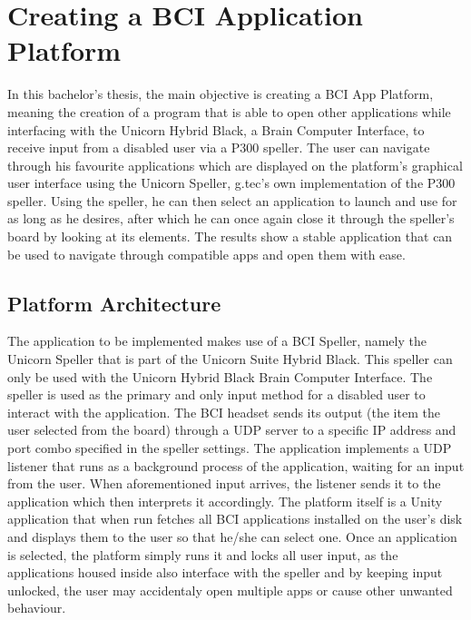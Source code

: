 
\chapter{Creating a BCI Application Platform}\label{cap:development}
In this bachelor's thesis, the main objective is creating a BCI App Platform, meaning the creation of a program that is able to open other applications while interfacing with the Unicorn Hybrid Black, a Brain Computer Interface, to receive input from a disabled user via a P300 speller. The user can navigate through his favourite applications which are displayed on the platform's graphical user interface using the Unicorn Speller, g.tec's own implementation of the P300 speller. Using the speller, he can then select an application to launch and use for as long as he desires, after which he can once again close it through the speller's board by looking at its elements. The results show a stable application that can be used to navigate through compatible apps and open them with ease.

\section{Platform Architecture}
The application to be implemented makes use of a BCI Speller, namely the Unicorn Speller that is part of the Unicorn Suite Hybrid Black. This speller can only be used with the Unicorn Hybrid Black Brain Computer Interface. The speller is used as the primary and only input method for a disabled user to interact with the application. The BCI headset sends its output (the item the user selected from the board) through a UDP server to a specific IP address and port combo specified in the speller settings. The application implements a UDP listener that runs as a background process of the application, waiting for an input from the user. When aforementioned input arrives, the listener sends it to the application which then interprets it accordingly.
\vspace{\baselineskip}\newline
The platform itself is a Unity application that when run fetches all BCI applications installed on the user's disk and displays them to the user so that he/she can select one. Once an application is selected, the platform simply runs it and locks all user input, as the applications housed inside also interface with the speller and by keeping input unlocked, the user may accidentaly open multiple apps or cause other unwanted behaviour.

